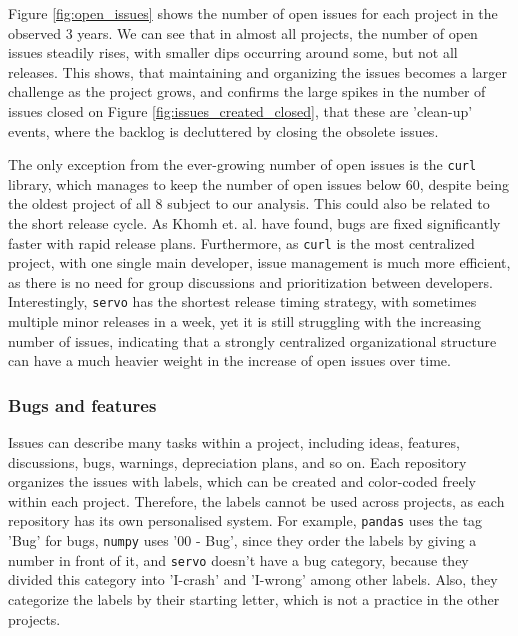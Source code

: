 Figure \ref{fig:open_issues} shows the number of open issues for each project in the observed 3 years. We can see that in almost all projects, the number of open issues steadily rises, with smaller dips occurring around some, but not all releases. This shows, that maintaining and organizing the issues becomes a larger challenge as the project grows, and confirms the large spikes in the number of issues closed on Figure \ref{fig:issues_created_closed}, that these are 'clean-up' events, where the backlog is decluttered by closing the obsolete issues.

The only exception from the ever-growing number of open issues is the \texttt{curl} library, which manages to keep the number of open issues below 60, despite being the oldest project of all 8 subject to our analysis. This could also be related to the short release cycle. As Khomh et. al. \cite{khomhFasterReleasesImprove2012} have found, bugs are fixed significantly faster with rapid release plans. Furthermore, as \texttt{curl} is the most centralized project, with one single main developer, issue management is much more efficient, as there is no need for group discussions and prioritization between developers. Interestingly, \texttt{servo} has the shortest release timing strategy, with sometimes multiple minor releases in a week, yet it is still struggling with the increasing number of issues, indicating that a strongly centralized organizational structure can have a much heavier weight in the increase of open issues over time. \\

\subsubsection{Bugs and features}

Issues can describe many tasks within a project, including ideas, features, discussions, bugs, warnings, depreciation plans, and so on. Each repository organizes the issues with labels, which can be created and color-coded freely within each project. Therefore, the labels cannot be used across projects, as each repository has its own personalised system. For example, \texttt{pandas} uses the tag 'Bug' for bugs, \texttt{numpy} uses '00 - Bug', since they order the labels by giving a number in front of it, and \texttt{servo} doesn't have a bug category, because they divided this category into 'I-crash' and 'I-wrong' among other labels. Also, they categorize the labels by their starting letter, which is not a practice in the other projects.

